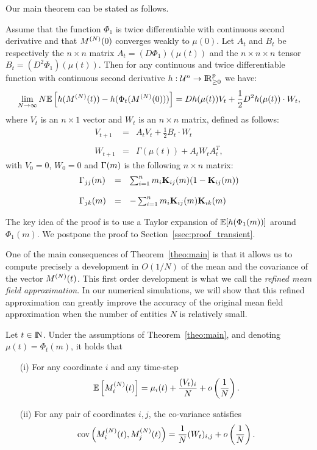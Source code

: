 \documentclass{elsarticle}
\begin{document}
Our main theorem can be stated as follows. 
\begin{theorem}\label{theo:main}
  Assume that the function $\Phi_1$ is twice differentiable with
  continuous second derivative and that $M^{(N)}(0)$ converges weakly to
  $\mu(0)$. Let $A_t$ and $B_t$ be respectively the $n \times n$
  matrix $A_t = (D \Phi_1)(\mu(t))$ and the $n \times n \times n$
  tensor $B_t = (D^2 \Phi_1)(\mu(t))$.  Then for any continuous and
  twice differentiable function with continuous second derivative
  $h:{\cal U}^n \rightarrow \mathrm{I\!R}_{\geq 0}^p$ we have:
$$
\lim_{N\rightarrow \infty} N\esp{h(\vt{M}\aN(t))- h(\Phi_t(\vt{M}\aN(0)))} =
Dh(\mu(t)) V_t + \frac{1}{2}D^2h(\mu(t))\cdot W_t,
$$
where $V_t$ is an $n \times 1$ vector and $W_t$ is an $n \times n$ matrix, defined as follows:
$$
\begin{array}{lcl}
V_{t+1} & = & A_tV_t + \frac{1}{2}B_t \cdot W_t\\\\
W_{t+1} & = & \Gamma(\mu(t)) + A_t W_t A_t^T,
\end{array}
$$
with $V_0=0$, $W_0 = 0$ and $\Gamma(m)$ is the following
$n \times n$ matrix:
$$
\begin{array}{lcl}
\Gamma_{jj}(m) & = &  \sum_{i=1}^n m_i \mathbf{K}_{ij}(m)(1-\mathbf{K}_{ij}(m))\\\\
\Gamma_{jk}(m) & = & -\sum_{i=1}^n m_i \mathbf{K}_{ij}(m)\mathbf{K}_{ik}(m)
\end{array}
$$

\end{theorem}
The key idea of the proof is to use a Taylor expansion of
$\esp{h(\Phi_1(m))}$ around $\Phi_1(m)$.  We postpone the proof to
Section~\ref{ssec:proof_transient}.

One of the main consequences of Theorem~\ref{theo:main} is that it
allows us to compute precisely a development in $O(1/N)$ of the mean
and the covariance of the vector $M^{(N)}(t)$. This first order
development is what we call the \emph{refined mean field
  approximation}. In our numerical simulations, we will show that this
refined approximation can greatly improve the accuracy of the original
mean field approximation when the number of entities $N$ is relatively small.
\begin{coro}
  \label{coro:main}
  Let $t\in\mathrm{I\!N}$. Under the assumptions of Theorem~\ref{theo:main},
  and denoting $\mu(t)=\Phi_t(m)$, it holds that
  \begin{itemize}
  \item[(i)] For any coordinate $i$ and any time-step
    \begin{align*}
      \esp{\MN_i(t)} = \mu_i(t) + \frac{(V_{t})_i}{N} +  o\p{\frac1N}.
    \end{align*}
  \item[(ii)] For any pair of coordinates $i,j$, the co-variance satisfies
    \begin{align*}
      \mathrm{cov}\left(M^{(N)}_i(t),M^{(N)}_j(t)\right) = \frac1N(W_{t})_{i,j} + o\left(\frac1N\right). 
    \end{align*}
  \end{itemize}
\end{coro}
\end{document}
